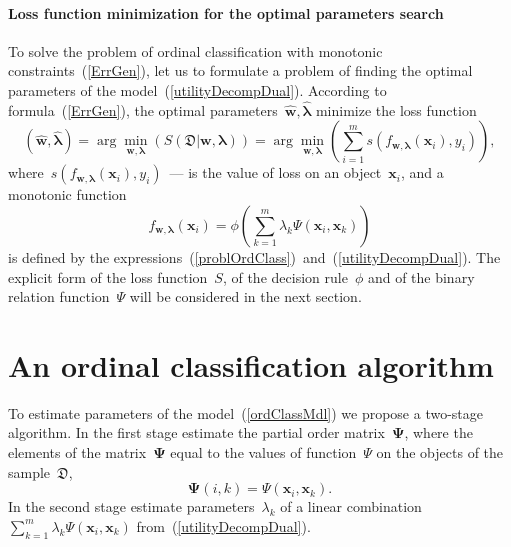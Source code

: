 \documentclass[12pt,preprint]{elsarticle}
\newcommand{\blambda}{\boldsymbol{\lambda}}
\newcommand{\bx}{\mathbf{x}}
\newcommand{\bw}{\mathbf{w}}
\newcommand{\bPsi}{\boldsymbol{\Psi}}
\begin{document}
\paragraph{Loss function minimization for the optimal parameters search}
To solve the problem of ordinal classification with monotonic constraints~(\ref{ErrGen}), let us to formulate a problem of finding the optimal parameters of the model~(\ref{utilityDecompDual}).
According to formula~(\ref{ErrGen}), the optimal parameters~$\hat{\bw},\hat{\blambda}$ minimize the loss function
\[
(\hat{\bw},\hat{\blambda})=\arg\min\limits_{\bw,\blambda}\left(S(\mathfrak{D}|\bw,\blambda)\right)=\arg\min\limits_{\bw,\blambda}\left(\sum\limits_{i=1}^m{s(f_{\bw,\blambda}(\bx_i), y_i)}\right),
\]
where~$s(f_{\bw,\blambda}(\bx_i), y_i)$~--- is the value of loss on an object~$\bx_i$, and a monotonic function
\begin{equation}
f_{\bw,\blambda}(\bx_i) = \phi\left(\sum\limits_{k=1}^m \lambda_{k} \Psi(\bx_i, \bx_k)\right)
\label{ordClassMdl}
\end{equation}
is defined by the expressions~(\ref{problOrdClass})~and~(\ref{utilityDecompDual}).
The explicit form of the loss function~$S$, of the decision rule~$\phi$ and of the binary relation function~$\Psi$ will be considered in the next section.
\section{An ordinal classification algorithm}
To estimate parameters of the model~(\ref{ordClassMdl}) we propose a two-stage algorithm. In the first stage estimate the partial order matrix~$\bPsi$, where the elements of the matrix~$\bPsi$ equal to the values of function~$\Psi$ on the objects of the sample~$\mathfrak{D}$,
\[
\bPsi(i,k) = \Psi(\bx_i,\bx_k).
\]
In the second stage estimate parameters~$\lambda_k$ of a linear combination~$\sum\limits_{k=1}^m \lambda_{k} \Psi(\bx_i, \bx_k)$ from~(\ref{utilityDecompDual}).
\end{document}
